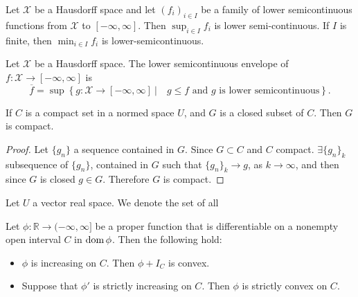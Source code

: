 \begin{lemma}
	Let $\mathcal{X}$ be a Hausdorff space and let $(f_i)_{i \in I}$ be a family of lower semicontinuous functions from $\mathcal{X}$ to $[-\infty, \infty]$. Then $\sup_{i\in I}f_i$ is lower semi-continuous. If $I$ is finite, then $\min_{i\in I}f_i$ is lower-semicontinuous.
\end{lemma}
\begin{definition}
	Let $\mathcal{X}$ be a Hausdorff space. The lower semicontinuous envelope of $f: \mathcal{X}\rightarrow[-\infty, \infty]$ is 
	\[
	\overline{f}=\sup \left\lbrace g: \mathcal{X}\rightarrow[-\infty, \infty] \ |\quad  g\leq f \text{ and } g \text{ is lower semicontinuous}\right\rbrace.
	\]
\end{definition}
\begin{proposition}
	If $C$ is a compact set in a normed space $U$, and $G$ is a closed subset of $C$. Then $G$ is compact.
	\begin{proof}
		Let $\{ g_n\}$ a sequence contained in $G$. Since $G \subset C$ and $C$ compact. $\exists \{g_n\}_k$ subsequence of $\{g_n\}$, contained in $G$ such that $\{g_n\}_k \rightarrow g$, as $k \rightarrow \infty$, and then since $G$ is closed $g \in G$. Therefore $G$ is compact.
	\end{proof}
	\label{prop0. closed subset compact. Precompact}
\end{proposition}

\begin{definition}
	Let $U$ a vector real space. We denote the set of all 
\end{definition}
\begin{proposition}
	\label{prop0. Convex and increasing derivative}
	Let $\phi:\mathbb{R}\rightarrow (-\infty, \infty]$ be a proper function that is differentiable on a nonempty open interval $C$ in $\mathrm{dom\,} \phi$. Then the following hold:
	\begin{itemize}
		\item $\phi$ is increasing on $C$. Then $\phi + I_C$ is convex.
		\item Suppose that $\phi'$ is strictly increasing on $C$. Then $\phi$ is strictly convex on $C$. 
	\end{itemize}
\end{proposition}



